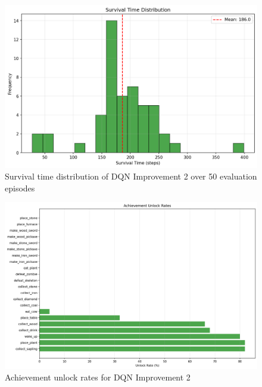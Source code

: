 \documentclass[twocolumn]{article}
\begin{document}
\begin{figure}[H]
	\centering
	\includegraphics[width=0.8\linewidth]{images/DQNImprov2survival_distribution.png}
	\caption{Survival time distribution of DQN Improvement 2 over 50 evaluation episodes}
	\label{fig:dqn_improv2_survival}
\end{figure}
\begin{figure}[H]
	\centering
	\includegraphics[width=0.8\linewidth]{images/DQNImprov2achievement_rates.png}
	\caption{Achievement unlock rates for DQN Improvement 2}
	\label{fig:dqn_improv2_achievements}
\end{figure}
\end{document}
